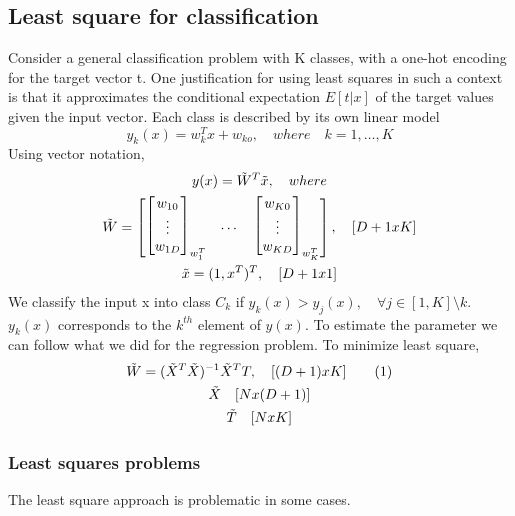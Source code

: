 \documentclass[main.tex]{subfiles}
\begin{document}
\subsection{Least square for classification}
Consider a general classification problem with K classes, with a one-hot encoding for the target vector t. One justification for using least squares in such a context is that it approximates the conditional expectation $E[t|x]$ of the target values given the input vector.
Each class is described by its own linear model
\begin{equation}
    y_k(x) = w_k^Tx + w_{ko},\quad where \quad k=1,\dots,K
\end{equation}
Using vector notation,
\begin{gather*}
    y(x) = \Tilde{W}^T \Tilde{x}, \quad where \\
    \Tilde{W}= 
    \begin{bmatrix}
        \begin{bmatrix}
        w_{10} \\ \vdots \\ w_{1D}
        \end{bmatrix}_{w_1^T} 
        & \dots &
        \begin{bmatrix}
        w_{K0} \\ \vdots \\ w_{KD}
        \end{bmatrix}_{w_K^T}
    \end{bmatrix},\quad [D+1 x K] \\
    \Tilde{x}=(1, x^T)^T, \quad [D+1 x 1]
\end{gather*}
We classify the input x into class $C_k$ if $y_k(x)>y_j(x), \quad \forall j \in [1, K] \setminus k$. $y_k(x)$ corresponds to the $k^{th}$ element of $y(x)$.
To estimate the parameter we can follow what we did for the regression problem. To minimize least square,
\begin{gather*}
    \Tilde{W} = (\Tilde{X}^T \Tilde{X})^{-1} \Tilde{X}^T T, \quad [(D+1) x K] \numberthis \\
    \Tilde{X} \quad [N x (D+1)] \\
    \Tilde{T} \quad [N x K]
\end{gather*}
\subsubsection{Least squares problems}
The least square approach is problematic in some cases.
\end{document}
